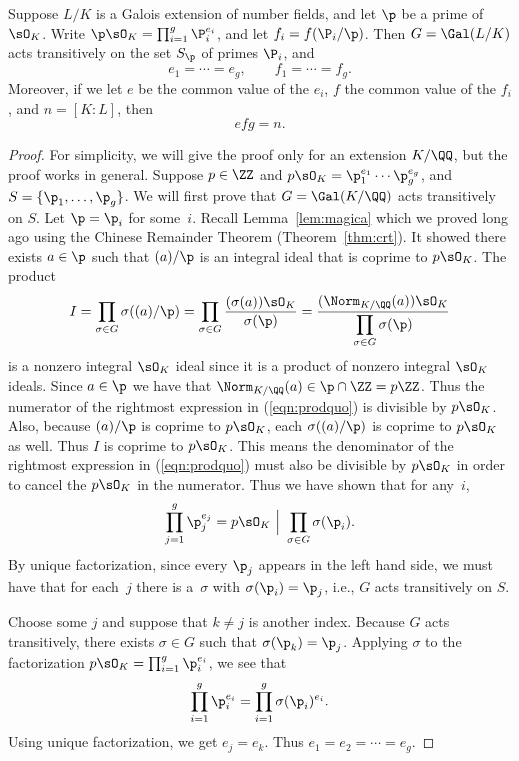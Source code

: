 \begin{theorem}\label{thm:transitive}
  Suppose $L/K$ is a Galois extension of number fields,
  and let $\p$ be a prime of $\sO_K$. 
  Write $\p\sO_K = \prod_{i=1}^g \P_i^{e_i}$, and let $f_i = f(\P_i/\p)$.
  Then $G = \Gal(L/K)$ acts transitively on the set $S_\p$ of primes $\P_i$,
  and
  \[
    e_1 = \cdots = e_g, \qquad f_1 = \cdots = f_g.
  \]
  Moreover, if we let $e$ be the common value of the $e_i$,
  $f$ the common value of the $f_i$, and $n = [K:L]$, then
  \[
    efg = n.
  \]
\end{theorem}
\begin{proof}
  For simplicity, we will give the proof only for an extension $K/\QQ$, but
  the proof works in general. Suppose $p \in \ZZ$ and
  $p\sO_K = \p_1^{e_1}\cdots \p_g^{e_g}$, and $S = \{\p_1,\ldots, \p_g\}$.  We
  will first prove that $G = \Gal(K/\QQ)$ acts transitively on $S$. 
  Let $\p = \p_i$ for some~$i$.
  Recall Lemma~\ref{lem:magica} which we proved long ago using the
  Chinese Remainder Theorem (Theorem~\ref{thm:crt}). It showed there exists
  $a\in\p$ such that $(a)/\p$ is an integral ideal that is
  coprime to $p\sO_K$.   The product
  \begin{equation}\label{eqn:prodquo}
    I = \prod_{\sigma\in G} \sigma((a)/\p)
    = \prod_{\sigma\in G} \frac{(\sigma(a))\sO_K}{\sigma(\p)}
    = \frac{(\Norm_{K/\QQ}(a))\sO_K}{\displaystyle \prod_{\sigma\in G} \sigma(\p)}
  \end{equation}
  is a nonzero integral $\sO_K$ ideal since it is a product of nonzero
  integral $\sO_K$ ideals.
  Since $a\in \p$ we have that
  $\Norm_{K/\QQ}(a) \in \p\cap\ZZ=p\ZZ$.  Thus the numerator of
  the rightmost expression in (\ref{eqn:prodquo}) is
  divisible by $p\sO_K$.   Also, because $(a)/\p$ is coprime
  to $p\sO_K$, each $\sigma((a)/\p)$ is coprime to $p\sO_K$
  as well.   Thus $I$ is coprime to $p\sO_K$.   This means the
  denominator of the rightmost expression in (\ref{eqn:prodquo})
  must also be divisible by $p\sO_K$ in order to cancel the $p\sO_K$
  in the numerator.  Thus we have shown that for any~$i$,
  \[
    \prod_{j=1}^g \p_j^{e_j}
    = p\sO_K \,\,\Big|\,\, \prod_{\sigma\in G} \sigma(\p_i).
  \]
  By unique factorization, since every $\p_j$ appears in the left hand
  side, we must have that for each~$j$ there is a~$\sigma$ with
  $\sigma(\p_i)=\p_j$, i.e., $G$ acts transitively on $S$.

  Choose some $j$ and suppose that $k\neq j$ is another index.  Because
  $G$ acts transitively, there exists $\sigma\in G$ such that
  $\sigma(\p_k)=\p_j$.  Applying $\sigma$ to the factorization $p\sO_K =
  \prod_{i=1}^g \p_i^{e_i}$, we see that
  \[
    \prod_{i=1}^g \p_i^{e_i} = \prod_{i=1}^g \sigma(\p_i)^{e_i}.
  \]
  Using unique factorization,
  we get $e_j = e_k$.  Thus $e_1=e_2=\cdots = e_g$.


\end{proof}
